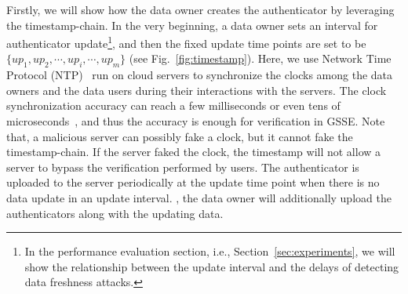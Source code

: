 Firstly, we will show how the data owner creates the authenticator by leveraging the timestamp-chain. In the very beginning, a data owner sets an interval for authenticator update\footnote{In the performance evaluation section, i.e., Section~\ref{sec:experiments}, we will show the relationship between the update interval and the delays of detecting data freshness attacks.}, and then the fixed update time points are set to be $\{up_1, up_2, \cdots, up_i, \cdots, up_m\}$ (see Fig.~\ref{fig:timestamp}). %
Here, we use Network Time Protocol (NTP)~\cite{mills1991internet, mills2010network} run on cloud servers
to synchronize the clocks among the data owners and the data users
during their interactions with the servers. The clock synchronization
accuracy can reach a few milliseconds or even tens of microseconds~\cite{kopetz1987clock, elson2002fine, zhou2007accurate}, and thus the accuracy is enough for verification in
GSSE. Note that, a malicious server can possibly fake a clock,
but it cannot fake the timestamp-chain. If the server faked the clock, the timestamp will not allow a server to bypass the verification performed by users.
The authenticator is uploaded to the server periodically at the update time point when there is no data update in an update interval. , the data owner will additionally upload the authenticators along with the updating data.
